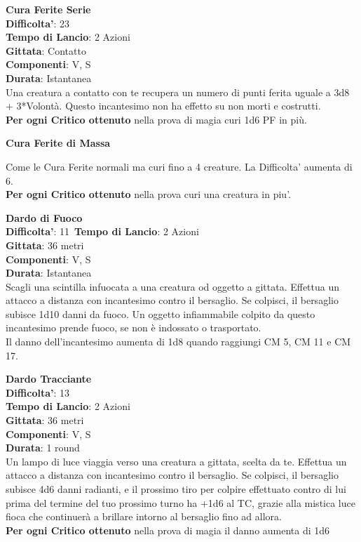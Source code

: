 \begin{multicols}{2}
\medskip\textbf{Cura Ferite Serie}\\
\textbf{Difficolta'}: 23 \\
\textbf{Tempo di Lancio}: 2 Azioni\\
\textbf{Gittata}: Contatto\\
\textbf{Componenti}: V, S\\
\textbf{Durata}: Istantanea\\
Una creatura a contatto con te recupera un numero di punti ferita uguale a 3d8 + 3*Volontà. Questo incantesimo non ha effetto su non morti e costrutti.\\
\textbf{Per ogni Critico ottenuto} nella prova di magia curi 1d6 PF in più.

\medskip\textbf{Cura Ferite di Massa}

Come le Cura Ferite normali ma curi fino a 4 creature.
La Difficolta' aumenta di 6.\\
\textbf{Per ogni Critico ottenuto} nella prova curi una creatura in piu'.

\medskip\textbf{Dardo di Fuoco}\\
\textbf{Difficolta'}: 11\
\textbf{Tempo di Lancio}: 2 Azioni\\
\textbf{Gittata}: 36 metri\\
\textbf{Componenti}: V, S\\
\textbf{Durata}: Istantanea\\
Scagli una scintilla infuocata a una creatura od oggetto a gittata. Effettua un attacco a distanza con incantesimo contro il bersaglio. Se colpisci, il bersaglio subisce 1d10 danni da fuoco. Un oggetto infiammabile colpito da questo incantesimo prende fuoco, se non è indossato o trasportato.\\
Il danno dell’incantesimo aumenta di 1d8 quando raggiungi CM 5, CM 11 e CM 17.

\medskip\textbf{Dardo Tracciante}\\
\textbf{Difficolta'}: 13\\
\textbf{Tempo di Lancio}: 2 Azioni\\
\textbf{Gittata}: 36 metri\\
\textbf{Componenti}: V, S\\
\textbf{Durata}: 1 round\\
Un lampo di luce viaggia verso una creatura a gittata, scelta da te. Effettua un attacco a distanza con incantesimo contro il bersaglio. Se colpisci, il bersaglio subisce 4d6 danni radianti, e il prossimo tiro per colpire effettuato contro di lui prima del termine del tuo
prossimo turno ha +1d6 al TC, grazie alla mistica luce fioca che continuerà a brillare intorno al bersaglio fino ad allora.\\
\textbf{Per ogni Critico ottenuto} nella prova di magia il danno aumenta di 1d6


\end{multicols}
